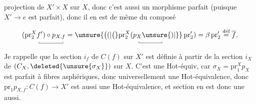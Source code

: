 
projection  de $X'\times X$ sur $X$, donc c'est aussi un morphisme parfait (puisque $X'\longrightarrow e$ est parfait), donc il en est de même du composé

\[
(\mathrm{pr}_2^X\underset{\raisebox{0pt}{\rule{.35pt}{.5ex}\rule{3.4em}{.35pt}\rule{.35pt}{.5ex}}}{f')\circ p_{X,f}}
=\unsure{\bigl((|\bigl(}\underset{\raisebox{0pt}{\rule{.35pt}{.5ex}\rule{3.3em}{.35pt}\rule{.35pt}{.5ex}}}{\mathrm{pr}_2^X(p_X\unsure{)|\}}}\,\mathrm{pr}_2')
=\beta\,\mathrm{pr}_2'\overset{\text{déf}}{=}\overline f.
\]

Je rappelle que  la section $i_f$ de $C(f)$ sur $X'$ est définie à partir de la section $i_X$ de $(C_X,\deleted{\unsure{\sigma_X}})$ sur $X$. C'est une Hot-équiv, car $\sigma_X=\mathrm{pr}_1^X p_X$ est parfait à fibres asphériques, donc universellement une Hot-équivalence, donc $\mathrm{pr}_1 p_{X,f}\colon C(f)\longrightarrow X'$ est aussi une Hot-équivalence, et  section en est donc une aussi.

